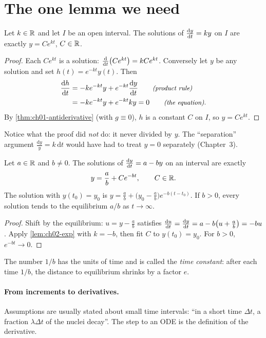 \section{The one lemma we need}\label{sec:ch02-lemma}

\begin{lemma}\label{lem:ch02-exp}
Let $k\in\mathbb{R}$ and let $I$ be an open interval. The solutions of
$\frac{\mathrm{d}y}{\mathrm{d}t} = ky$ on $I$ are exactly $y = Ce^{kt}$, $C\in\mathbb{R}$.
\end{lemma}
\begin{proof}
Each $Ce^{kt}$ is a solution: $\frac{\mathrm{d}}{\mathrm{d}t}\bigl(Ce^{kt}\bigr) = kCe^{kt}$.
Conversely let $y$ be any solution and set $h(t) = e^{-kt}y(t)$. Then
\begin{align*}
  \frac{\mathrm{d}h}{\mathrm{d}t} &= -ke^{-kt}y + e^{-kt}\frac{\mathrm{d}y}{\mathrm{d}t} \qquad\text{\small\itshape(product rule)}\\
             &= -ke^{-kt}y + e^{-kt}ky = 0 \qquad\text{\small\itshape(the equation)}.
\end{align*}
By \cref{thm:ch01-antiderivative} (with $g\equiv 0$), $h$ is a constant $C$ on
$I$, so $y = Ce^{kt}$.
\end{proof}

Notice what the proof did \emph{not} do: it never divided by $y$. The
``separation'' argument $\frac{\mathrm{d}y}{y} = k\,\mathrm{d}t$ would have
had to treat $y = 0$ separately (Chapter~3).

\begin{corollary}\label{cor:ch02-affine}
Let $a\in\mathbb{R}$ and $b\neq 0$. The solutions of $\frac{\mathrm{d}y}{\mathrm{d}t} = a - by$ on an
interval are exactly
\[
  y = \frac{a}{b} + Ce^{-bt},\qquad C\in\mathbb{R} .
\]
The solution with $y(t_0) = y_0$ is
$y = \frac{a}{b} + \bigl(y_0 - \frac{a}{b}\bigr)e^{-b(t - t_0)}$. If $b>0$,
every solution tends to the equilibrium $a/b$ as $t\to\infty$.
\end{corollary}
\begin{proof}
Shift by the equilibrium: $u = y - \frac ab$ satisfies
$\frac{\mathrm{d}u}{\mathrm{d}t} = \frac{\mathrm{d}y}{\mathrm{d}t} = a - b\bigl(u + \frac ab\bigr) = -bu$. Apply
\cref{lem:ch02-exp} with $k = -b$, then fit $C$ to $y(t_0) = y_0$. For $b>0$,
$e^{-bt}\to 0$.
\end{proof}

The number $1/b$ has the units of time and is called the \emph{time constant}:
after each time $1/b$, the distance to equilibrium shrinks by a factor $e$.

\paragraph{From increments to derivatives.} Assumptions are usually stated
about small time intervals: ``in a short time $\Delta t$, a fraction
$\lambda\Delta t$ of the nuclei decay''. The step to an ODE is the definition
of the derivative.

